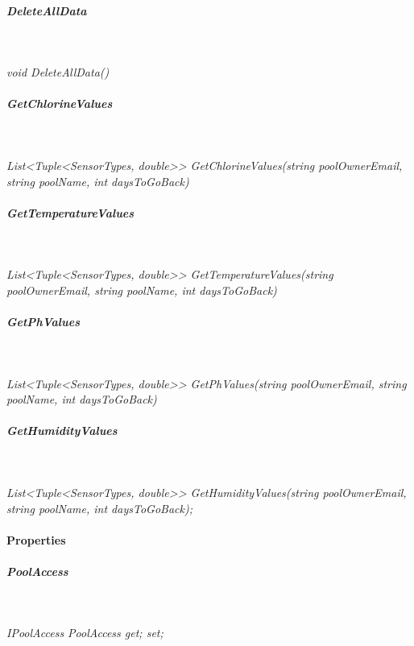 \subparagraph{DeleteAllData}\

\textit{void DeleteAllData()}

\subparagraph{GetChlorineValues}\

\textit{List<Tuple<SensorTypes, double>> GetChlorineValues(string poolOwnerEmail, string poolName, int daysToGoBack)}

\subparagraph{GetTemperatureValues}\

\textit{List<Tuple<SensorTypes, double>> GetTemperatureValues(string poolOwnerEmail, string poolName, int daysToGoBack)}

\subparagraph{GetPhValues}\

\textit{List<Tuple<SensorTypes, double>> GetPhValues(string poolOwnerEmail, string poolName, int daysToGoBack)}

\subparagraph{GetHumidityValues}\

\textit{List<Tuple<SensorTypes, double>> GetHumidityValues(string poolOwnerEmail, string poolName, int daysToGoBack);}

\paragraph{Properties}

\subparagraph{PoolAccess}\

\textit{IPoolAccess PoolAccess { get; set; }}

